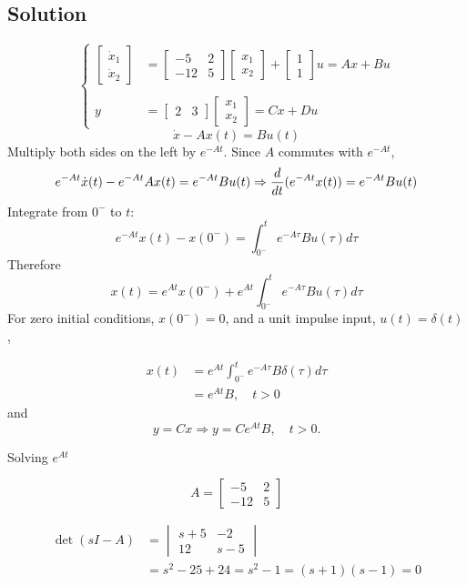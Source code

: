 \documentclass[12pt,a4paper]{article}
\begin{document}
\subsection*{Solution}
\[
\begin{cases}
	\begin{bmatrix}
		\dot x_1 \\ \dot x_2
	\end{bmatrix} &= \begin{bmatrix}
		-5 & 2 \\ -12 & 5
	\end{bmatrix}\begin{bmatrix}
	x_1 \\ x_2
	\end{bmatrix} + \begin{bmatrix}
	1 \\ 1
	\end{bmatrix}u = Ax + Bu \\ \\
	y &= \begin{bmatrix}
		2 & 3 
	\end{bmatrix}
	\begin{bmatrix}
		x_1 \\ x_2
	\end{bmatrix} = Cx + Du
\end{cases} 
\]
\[
\dot x - Ax(t) = Bu(t)
\]
Multiply both sides on the left by $e^{-At}$. Since $A$ commutes with $e^{-At}$,
\[
e^{-At}\dot x(t) - e^{-At}Ax(t) = e^{-At}Bu(t) \Rightarrow{d\over dt} (e^{-At}x(t)) = e^{-At}Bu(t)
\]
Integrate from $0^-$ to $t$:
\[
e^{-At}x(t) - x(0^-) = \int_{0^-}^t e^{-A\tau}Bu(\tau)d\tau
\]
Therefore
\[
x(t) = e^{At}x(0^-)+ e^{At}\int_{0^-}^t e^{-A\tau}Bu(\tau)d\tau 
\]
For zero initial conditions, $x(0^-)=0$, and a unit impulse input, $u(t)=\delta(t)$,

\begin{align*}
	x(t) &= e^{At}\int_{0^-}^t e^{-A\tau}B\delta(\tau)d\tau \\
	&=e^{At} B, \quad t > 0
\end{align*}
and
\[
y = Cx \Rightarrow y = Ce^{At}B, \quad t > 0.
\]

\vspace{1cm}
Solving $e^{At}$

\[
A = \begin{bmatrix}
	-5 & 2 \\ -12 & 5
\end{bmatrix}
\]

\begin{align*}
	\det (sI - A) &= \begin{vmatrix}
		s + 5 & -2 \\ 12 & s - 5 
	\end{vmatrix} \\
	&= s^2 - 25 + 24 = s^2 -1  = (s + 1)(s - 1) = 0
\end{align*}
\end{document}
